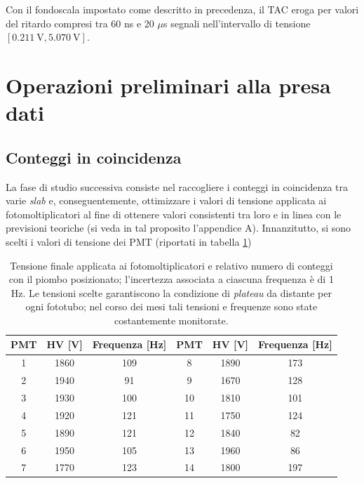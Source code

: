 \documentclass[10pt, oneside, a4paper]{article}   	%
\begin{document}
Con il fondoscala impostato come descritto in precedenza, il TAC eroga per valori del ritardo compresi tra 60 ns e 20 $\mu$s segnali nell'intervallo di tensione $[0.211 \ \mbox{V}, 5.070 \ \mbox{V}]$.
%
%
\section{Operazioni preliminari alla presa dati}
\subsection{Conteggi in coincidenza}
La fase di studio successiva consiste nel raccogliere i conteggi in coincidenza tra varie \emph{slab} e, conseguentemente, ottimizzare i valori di tensione applicata ai fotomoltiplicatori al fine di ottenere valori consistenti tra loro e in linea con le previsioni teoriche (si veda in tal proposito l'appendice A). 
Innanzitutto, si sono scelti i valori di tensione dei PMT (riportati in tabella \ref{HV_counts}) 
%
\begin{table}[b]
		\centering
	\begin{tabular}{ccc|ccc}
		\toprule
		PMT	&	HV [V]	&	Frequenza [Hz]	&PMT	&	HV [V]	&	Frequenza [Hz]\\	
		\midrule
		1	&	1860	&	109	&8	&	1890	&	173\\
		2	&	1940	&	91	&9	&	1670	&	128\\
		3	&	1930	&	100	&10	&	1810	&	101\\
		4	&	1920	&	121	&11	&	1750	&	124\\
		5	&	1890	&	121	&12	&	1840	&	82 \\
		6	&	1950	&	105	&13	&	1960	&	86 \\
		7	&	1770	&	123	&14	&	1800	&	197\\
		\bottomrule
	\end{tabular}
	\caption{Tensione finale applicata ai fotomoltiplicatori e relativo numero di conteggi con il piombo posizionato; l'incertezza associata a ciascuna frequenza è di 1 Hz. Le tensioni scelte garantiscono la condizione di \emph{plateau} da distante per ogni fototubo; nel corso dei mesi tali tensioni e frequenze sono state costantemente monitorate.}
	\label{HV_counts}
\end{table}
\end{document}
